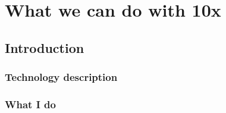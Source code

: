 \documentclass[main.tex]{subfiles}
\begin{document}
\chapter{What we can do with 10x}

\section{Introduction}

\subsection{Technology description}

\subsection{What I do}
\end{document}
